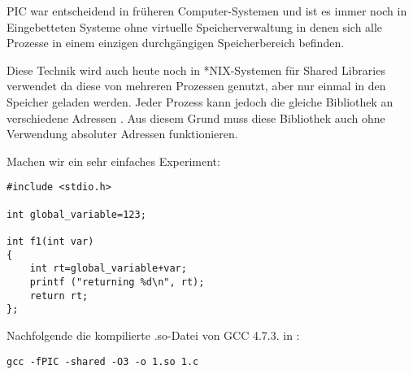 \ac{PIC} war entscheidend in früheren Computer-Systemen und ist es immer noch in Eingebetteten
Systeme ohne virtuelle Speicherverwaltung in denen sich alle Prozesse in einem einzigen durchgängigen
Speicherbereich befinden.

Diese Technik wird auch heute noch in *NIX-Systemen für Shared Libraries verwendet
da diese von mehreren Prozessen genutzt, aber nur einmal in den Speicher geladen werden.
Jeder Prozess kann jedoch die gleiche Bibliothek an verschiedene Adressen .
Aus diesem Grund muss diese Bibliothek auch ohne Verwendung absoluter Adressen funktionieren.

Machen wir ein sehr einfaches Experiment:

\begin{lstlisting}
#include <stdio.h>

int global_variable=123;

int f1(int var)
{
    int rt=global_variable+var;
    printf ("returning %d\n", rt);
    return rt;
};
\end{lstlisting}

Nachfolgende die kompilierte .so-Datei von GCC 4.7.3. in \IDA:

\begin{lstlisting}
gcc -fPIC -shared -O3 -o 1.so 1.c
\end{lstlisting}

